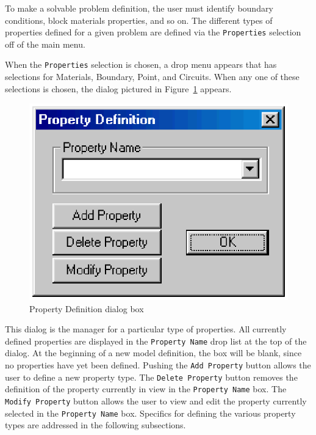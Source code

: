 \documentclass[12pt]{report}
\begin{document}
To make a solvable problem definition, the user must identify
boundary conditions, block materials properties, and so on.  The
different types of properties defined for a given problem are
defined via the {\tt Properties} selection off of the main menu.

When the {\tt Properties} selection is chosen, a drop menu appears
that has selections for Materials, Boundary, Point, and Circuits.
When any one of these selections is chosen, the dialog pictured in
Figure~\ref{propertydef} appears.
\begin{figure}[ht]
\centerline{\includegraphics{propdef.ps}}
\caption{Property Definition dialog box}
\label{propertydef}
\end{figure}
This dialog is the manager for a particular type of properties. All
currently defined properties are displayed in the {\tt Property
Name} drop list at the top of the dialog.  At the beginning of a
new model definition, the box will be blank, since no properties
have yet been defined.  Pushing the {\tt Add Property} button
allows the user to define a new property type. The {\tt Delete
Property} button removes the definition of the property currently
in view in the {\tt Property Name} box.  The {\tt Modify Property}
button allows the user to view and edit the property currently
selected in the {\tt Property Name} box. Specifics for defining
the various property types are addressed in the following
subsections.
\end{document}
